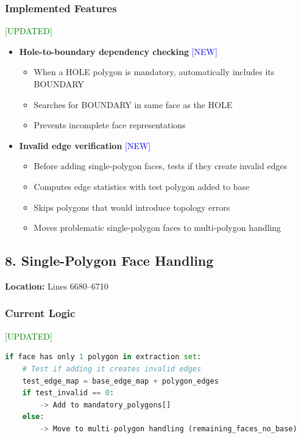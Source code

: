 \documentclass[11pt]{article}
\begin{document}
\subsubsection{Implemented Features} \textcolor{green}{[UPDATED]}
\begin{itemize}
    \item[\textcolor{green}{$\checkmark$}] \textbf{Hole-to-boundary dependency checking} \textcolor{blue}{[NEW]}
    \begin{itemize}
        \item When a HOLE polygon is mandatory, automatically includes its BOUNDARY
        \item Searches for BOUNDARY in same face as the HOLE
        \item Prevents incomplete face representations
    \end{itemize}
    \item[\textcolor{green}{$\checkmark$}] \textbf{Invalid edge verification} \textcolor{blue}{[NEW]}
    \begin{itemize}
        \item Before adding single-polygon faces, tests if they create invalid edges
        \item Computes edge statistics with test polygon added to base
        \item Skips polygons that would introduce topology errors
        \item Moves problematic single-polygon faces to multi-polygon handling
    \end{itemize}
\end{itemize}

\subsection{8. Single-Polygon Face Handling}
\textbf{Location:} Lines 6680--6710

\subsubsection{Current Logic} \textcolor{green}{[UPDATED]}
\begin{lstlisting}[language=Python]
if face has only 1 polygon in extraction set:
    # Test if adding it creates invalid edges
    test_edge_map = base_edge_map + polygon_edges
    if test_invalid == 0:
        -> Add to mandatory_polygons[]
    else:
        -> Move to multi-polygon handling (remaining_faces_no_base)
\end{lstlisting}
\end{document}
